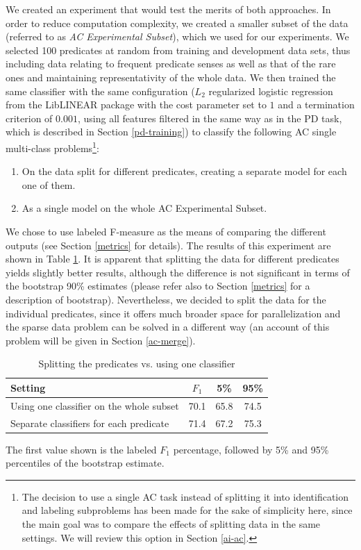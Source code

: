 \documentclass[12pt,notitlepage]{report}
\begin{document}
We created an experiment that would test the merits of both approaches. In order to reduce computation complexity, we created a smaller subset of the data (referred to as \emph{AC Experimental Subset}), which we used for our experiments. We selected 100 predicates at random from training and development data sets, thus including data relating to frequent predicate senses as well as that of the rare ones and maintaining representativity of the whole data. We then trained the same classifier with the same configuration ($L_2$ regularized logistic regression from the LibLINEAR package with the cost parameter set to $1$ and a termination criterion of $0.001$, using all features filtered in the same way as in the PD task, which is described in Section \ref{pd-training}) to classify the following AC single multi-class problems\footnote{The decision to use a single AC task instead of splitting it into identification and labeling subproblems has been made for the sake of simplicity here, since the main goal was to compare the effects of splitting data in the same settings. We will review this option in Section \ref{ai-ac}.}:
\begin{enumerate}
    \item On the data split for different predicates, creating a separate model for each one of them.
    \item As a single model on the whole AC Experimental Subset.
\end{enumerate}
We chose to use labeled F-measure as the means of comparing the different outputs (see Section \ref{metrics} for details). The results of this experiment are shown in Table \ref{tab:one-bag}. It is apparent that splitting the data for different predicates yields slightly better results, although the difference is not significant in terms of the bootstrap 90\% estimates (please refer also to Section \ref{metrics} for a description of bootstrap). Nevertheless, we decided to split the data for the individual predicates, since it offers much broader space for parallelization and the sparse data problem can be solved in a different way (an account of this problem will be given in Section \ref{ac-merge}).

\begin{table}[htb]\label{tab:one-bag}
\caption{Splitting the predicates vs. using one classifier}\footnotesize
\begin{center}
\begin{tabular}{|l|c|c|c|}\hline
\bf Setting & $F_1$ & \bf 5\% & \bf 95\% \\\hline
Using one classifier on the whole subset & 70.1 & 65.8 & 74.5 \\
Separate classifiers for each predicate &  71.4 & 67.2 & 75.3 \\\hline
\end{tabular}
\end{center}
The first value shown is the labeled $F_1$ percentage, followed by 5\% and 95\% percentiles of the bootstrap estimate.
\end{table}
\end{document}
